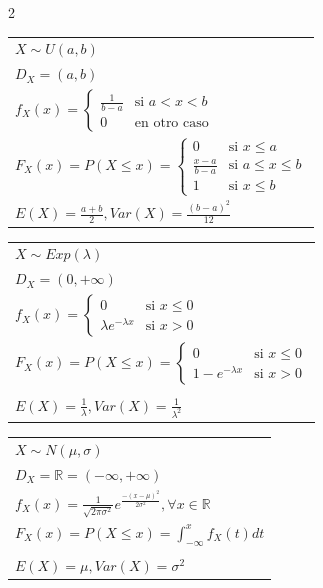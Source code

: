 \documentclass[10pt,a4paper]{article}
\begin{document}
\begin{multicols}{2}
    \begin{tcolorbox}[title=Uniforme, equal height group=DN5]
        \begin{tabular}{l}
            $X \sim U(a, b)$ \\
            $D_X = (a, b)$ \\
            $f_X(x) = \begin{cases} \frac{1}{b-a} & \text{si } a < x < b \\ 0 & \text{en otro caso}\end{cases}$ \\
            $F_X(x) = P(X \leq x) = \begin{cases} 0 & \text{si } x \leq a \\ \frac{x-a}{b-a} & \text{si } a \leq x \leq b \\ 1 & \text{si } x \leq b\end{cases}$ \\
            $E(X) = \frac{a+b}{2}, Var(X) = \frac{(b-a)^2}{12}$
        \end{tabular}
    \end{tcolorbox}
    \begin{tcolorbox}[title=Exponencial, equal height group=DN5]
        \begin{tabular}{l}
            $X \sim Exp(\lambda)$ \\
            $D_X = (0, +\infty)$ \\
            $f_X(x) = \begin{cases} 0 & \text{si } x \leq 0 \\ \lambda e^{-\lambda x} & \text{si } x > 0\end{cases}$ \\
            $F_X(x) = P(X \leq x) = \begin{cases} 0 & \text{si } x \leq 0 \\ 1 - e^{-\lambda x} & \text{si } x > 0\end{cases}$ \\
            \\
            $E(X) = \frac{1}{\lambda}, Var(X) = \frac{1}{\lambda^2}$
        \end{tabular}
    \end{tcolorbox}
\end{multicols}

\begin{tcolorbox}[title=Normal o Gaussiana, equal height group=DN6]
    \begin{tabular}{l}
        $X \sim N(\mu, \sigma)$ \\
        $D_X = \mathbb{R} = (-\infty, +\infty)$ \\
        $f_X(x) = \frac{1}{\sqrt{2\pi \sigma^2}}e^{\frac{-(x-\mu)^2}{2\sigma^2}}, \forall x \in \mathbb{R}$ \\
        $F_X(x) = P(X \leq x) = \int_{-\infty}^{x} f_X(t)dt$ \\
        \\
        $E(X) = \mu, Var(X) = \sigma^2$
    \end{tabular}
\end{tcolorbox}
\end{document}
